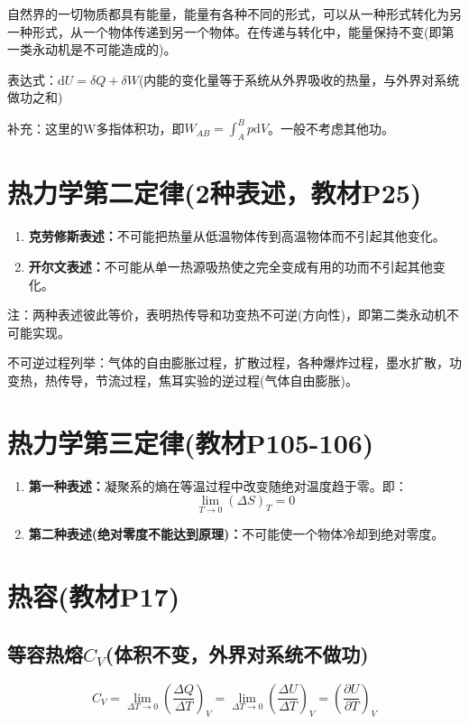\documentclass[oneside]{ctexbook}
\begin{document}
自然界的一切物质都具有能量，能量有各种不同的形式，可以从一种形式转化为另一种形式，从一个物体传递到另一个物体。在传递与转化中，能量保持不变(即第一类永动机是不可能造成的)。

表达式：\(\mathrm{d}U=\delta{}Q+\delta{}W\)(内能的变化量等于系统从外界吸收的热量，与外界对系统做功之和)

补充：这里的W多指体积功，即\(W_{AB}=\int_A^Bp\mathrm{d}V\)。一般不考虑其他功。

\section{热力学第二定律(2种表述，教材P25)}
\begin{enumerate}
    \item \textbf{克劳修斯表述：}不可能把热量从低温物体传到高温物体而不引起其他变化。
    \item \textbf{开尔文表述：}不可能从单一热源吸热使之完全变成有用的功而不引起其他变化。
\end{enumerate}

注：两种表述彼此等价，表明热传导和功变热不可逆(方向性)，即第二类永动机不可能实现。

不可逆过程列举：气体的自由膨胀过程，扩散过程，各种爆炸过程，墨水扩散，功变热，热传导，节流过程，焦耳实验的逆过程(气体自由膨胀)。

\section{热力学第三定律(教材P105-106)}
\begin{enumerate}
    \item \textbf{第一种表述：}凝聚系的熵在等温过程中改变随绝对温度趋于零。即：\begin{equation}\lim_{T\to{}0}(\Delta{}S)_T=0\end{equation}
    \item \textbf{第二种表述(绝对零度不能达到原理)：}不可能使一个物体冷却到绝对零度。
\end{enumerate}

\section{热容(教材P17)}

\subsection{等容热熔\(C_V\)(体积不变，外界对系统不做功)}
\begin{equation}
C_V=\lim_{\Delta{}T\to0}\left(\dfrac{\Delta{}Q}{\Delta{}T}\right)_V=\lim_{\Delta{}T\to0}\left(\dfrac{\Delta{}U}{\Delta{}T}\right)_V=\left(\dfrac{\partial{}U}{\partial{}T}\right)_V
\end{equation}
\end{document}
